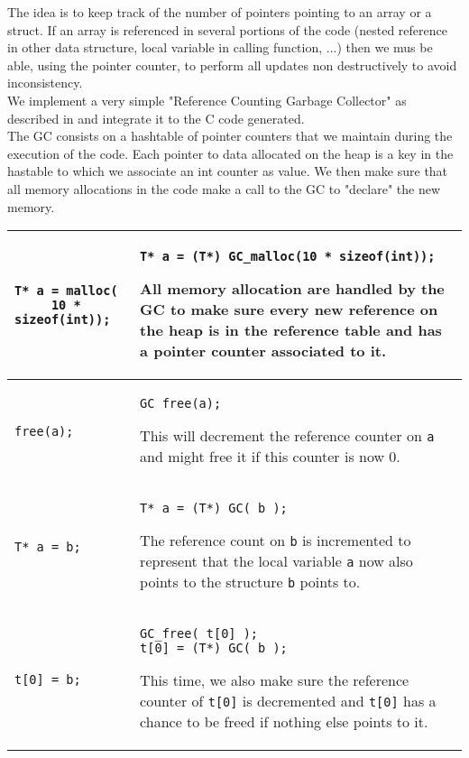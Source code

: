 \documentclass[12pt,a4paper]{article}
\newcommand{\cl}[1]{\texttt{#1}}
\begin{document}
The idea is to keep track of the number of pointers pointing to an array or a struct. If an array is referenced in several portions of the code (nested reference in other data structure, local variable in calling function, ...) then we mus be able, using the pointer counter, to perform all updates non destructively to avoid inconsistency.\\

We implement a very simple "Reference Counting Garbage Collector" as described in \cite{jonesgarbage} and integrate it to the C code generated.\\

The GC consists on a hashtable of pointer counters that we maintain during the execution of the code. Each pointer to data allocated on the heap is a key in the hastable to which we associate an int counter as value. We then make sure that all memory allocations in the code make a call to the GC to "declare" the new memory.

\begin{tabular}{|p{5cm}|p{11cm}|}
\hline
\begin{lstlisting}
T* a = malloc(
     10 * sizeof(int));
\end{lstlisting} & \begin{lstlisting}
T* a = (T*) GC_malloc(10 * sizeof(int));
\end{lstlisting}
All memory allocation are handled by the GC to make sure every new reference on the heap is in the reference table and has a pointer counter associated to it.
\\ \hline
\begin{lstlisting}
free(a);
\end{lstlisting} & \begin{lstlisting}
GC_free(a);
\end{lstlisting}
This will decrement the reference counter on \cl{a} and might free it if this counter is now 0. \\ \hline
\begin{lstlisting}
T* a = b;
\end{lstlisting} & \begin{lstlisting}
T* a = (T*) GC( b );
\end{lstlisting}
The reference count on \cl{b} is incremented to represent that the local variable \cl{a} now also points to the structure \cl{b} points to.\\ \hline
\begin{lstlisting}
t[0] = b;
\end{lstlisting} & \begin{lstlisting}
GC_free( t[0] );
t[0] = (T*) GC( b );
\end{lstlisting}
This time, we also make sure the reference counter of \cl{t[0]} is decremented and \cl{t[0]} has a chance to be freed if nothing else points to it.\\ \hline
\end{tabular}
\end{document}
